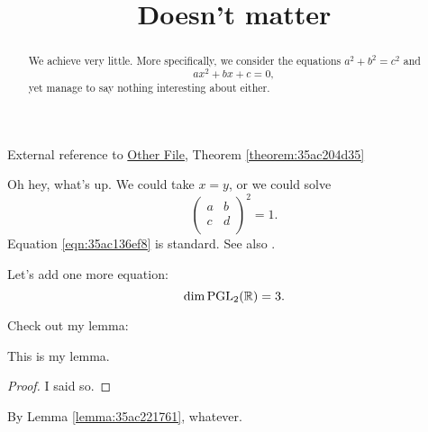\documentclass[reqno]{amsart} 
\title{Doesn't matter}
\numberwithin{equation}{section}
\numberwithin{theorem}{section}
\begin{document}
\maketitle

\begin{abstract}
  We achieve very little.  More specifically, we consider the equations
  \(a^2 + b^2 = c^2\) and
  \begin{equation*}
a x^2 + b x + c = 0,
\end{equation*}
yet manage to say nothing interesting about either.
\end{abstract}

External reference to \href{test2.pdf}{Other File}, Theorem \ref{theorem:35ac204d35}

Oh hey, what's up.  We could take $x = y$, or we could solve
\begin{equation}\label{eqn:35ac136ef8}
  \begin{pmatrix}
    a & b \\
    c & d \\
  \end{pmatrix}^2 = 1.
\end{equation}
Equation \eqref{eqn:35ac136ef8} is standard.  See also \cite{2021arXiv210915230N}.

Let's add one more equation:
\begin{equation*}
\dim \operatorname{PGL}_2(\mathbb{R}) = 3.
\end{equation*}

Check out my lemma:
\begin{lemma}\label{lemma:35ac221761}
This is my lemma.
\end{lemma}
\begin{proof}
I said so.
\end{proof}
By Lemma \ref{lemma:35ac221761}, whatever.
\end{document}
